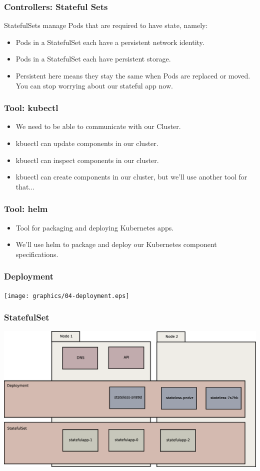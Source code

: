 \documentclass{beamer}
\begin{document}
\begin{frame}
    \frametitle{Controllers: Stateful Sets}
    StatefulSets manage Pods that are required to have state, namely:
    \begin{itemize}
        \item Pods in a StatefulSet each have a persistent network identity.
        \item Pods in a StatefulSet each have persistent storage.
        \item Persistent here means they stay the same when Pods are replaced or moved. You can stop worrying about our stateful app now.
    \end{itemize}
\end{frame}

\begin{frame}
\frametitle{Tool: kubectl\footnotemark}
\begin{itemize}
\item We need to be able to communicate with our Cluster.
\item kbuectl can update components in our cluster.
\item kbuectl can inspect components in our cluster.
\item kbuectl can create components in our cluster, but we'll use another tool for that...
\end{itemize}
\end{frame}

\begin{frame}
\frametitle{Tool: helm\footnotemark}
\begin{itemize}
    \item Tool for packaging and deploying Kubernetes apps.
    \item We'll use helm to package and deploy our Kubernetes component specifications.
\end{itemize}
\end{frame}

\begin{frame}
    \frametitle{Deployment}
    \texttt{[image: graphics/04-deployment.eps]}
\end{frame}

\begin{frame}
    \frametitle{StatefulSet}
    \includegraphics[width=\textwidth,height=0.85\textheight,keepaspectratio]{graphics/05-statefulSet.eps}
\end{frame}
\end{document}
